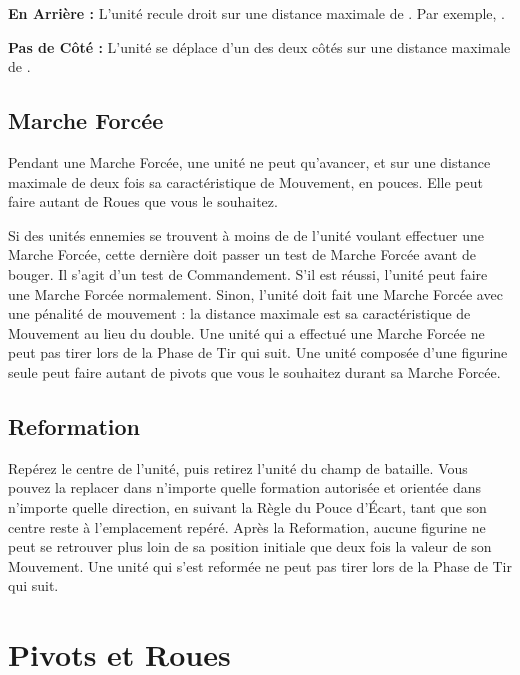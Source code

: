 \noindent\textbf{En Arrière :} L'unité recule droit sur une distance maximale de . Par exemple, .

\noindent\textbf{Pas de Côté :} L'unité se déplace d'un des deux côtés sur une distance maximale de .

\subsection{Marche Forcée}

Pendant une Marche Forcée, une unité ne peut qu'avancer, et sur une distance maximale de deux fois sa caractéristique de Mouvement, en pouces. Elle peut faire autant de Roues que vous le souhaitez. 

Si des unités ennemies se trouvent à moins de  de l'unité voulant effectuer une Marche Forcée, cette dernière doit passer un test de Marche Forcée avant de bouger. Il s'agit d'un test de Commandement. S'il est réussi, l'unité peut faire une Marche Forcée normalement. Sinon, l'unité doit fait une Marche Forcée avec une pénalité de mouvement : la distance maximale est sa caractéristique de Mouvement au lieu du double. Une unité qui a effectué une Marche Forcée ne peut pas tirer lors de la Phase de Tir qui suit. Une unité composée d'une figurine seule peut faire autant de pivots que vous le souhaitez durant sa Marche Forcée.

\subsection{Reformation}

Repérez le centre de l'unité, puis retirez l'unité du champ de bataille. Vous pouvez la replacer dans n'importe quelle formation autorisée et orientée dans n'importe quelle direction, en suivant la Règle du Pouce d'Écart, tant que son centre reste à l'emplacement repéré. Après la Reformation, aucune figurine ne peut se retrouver plus loin de sa position initiale que deux fois la valeur de son Mouvement. Une unité qui s'est reformée ne peut pas tirer lors de la Phase de Tir qui suit.

\newpage
\section{Pivots et Roues}

